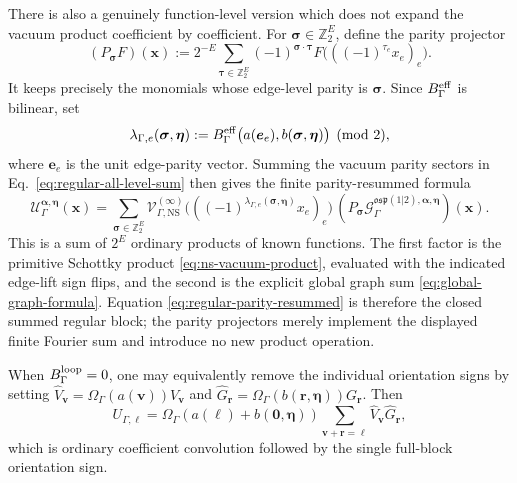 \documentclass[11pt]{article}
\newcommand{\NS}{\mathrm{NS}}
\newcommand{\osp}{\mathfrak{osp}(1|2)}
\newcommand{\G}{\mathcal G}
\newcommand{\V}{\mathcal V}
\newcommand{\U}{\mathcal U}
\begin{document}
There is also a genuinely function-level version which does not expand the
vacuum product coefficient by coefficient.  For
\(\bm\sigma\in\mathbb Z_2^E\), define the parity projector
\begin{equation}
 (P_{\bm\sigma}F)(\bm x)
 :=2^{-E}\sum_{\bm\tau\in\mathbb Z_2^E}
 (-1)^{\bm\sigma\cdot\bm\tau}
 F\bigl(((-1)^{\tau_e}x_e)_e\bigr).
 \label{eq:edge-parity-projector}
\end{equation}
It keeps precisely the monomials whose edge-level parity is
\(\bm\sigma\).  Since \(B_\Gamma^{\rm eff}\) is bilinear, set
\begin{equation}
 \lambda_{\Gamma,e}(\bm\sigma,\bm\eta)
 :=B_\Gamma^{\rm eff}\bigl(a(\bm e_e),b(\bm\sigma,\bm\eta)\bigr)
 \pmod2,
 \label{eq:regular-sign-flip-vector}
\end{equation}
where \(\bm e_e\) is the unit edge-parity vector.  Summing the vacuum
parity sectors in Eq.~\eqref{eq:regular-all-level-sum} then gives the finite
parity-resummed formula
\begin{equation}
\boxed{
 \U_\Gamma^{\bm\alpha,\bm\eta}(\bm x)
 =\sum_{\bm\sigma\in\mathbb Z_2^E}
 \V_{\Gamma,\NS}^{(\infty)}
 \bigl(((-1)^{\lambda_{\Gamma,e}(\bm\sigma,\bm\eta)}x_e)_e\bigr)
 \,(P_{\bm\sigma}
 \G_\Gamma^{\osp,\bm\alpha,\bm\eta})(\bm x).}
 \label{eq:regular-parity-resummed}
\end{equation}
This is a sum of \(2^E\) ordinary products of known functions.  The first
factor is the primitive Schottky product
\eqref{eq:ns-vacuum-product}, evaluated with the indicated edge-lift sign
flips, and the second is the explicit global graph sum
\eqref{eq:global-graph-formula}.  Equation
\eqref{eq:regular-parity-resummed} is therefore the closed summed regular
block; the parity projectors merely implement the displayed finite Fourier
sum and introduce no new product operation.

When \(B_\Gamma^{\rm loop}=0\), one may equivalently remove the individual
orientation signs by setting
\(\widehat V_{\bm v}=\Omega_\Gamma(a(\bm v))V_{\bm v}\) and
\(\widehat G_{\bm r}=\Omega_\Gamma(b(\bm r,\bm\eta))G_{\bm r}\).  Then
\begin{equation}
 U_{\Gamma,\bm\ell}
 =\Omega_\Gamma(a(\bm\ell)+b(\bm0,\bm\eta))
  \sum_{\bm v+\bm r=\bm\ell}
  \widehat V_{\bm v}\widehat G_{\bm r},
 \label{eq:orientation-free-convolution}
\end{equation}
which is ordinary coefficient convolution followed by the single full-block
orientation sign.
\end{document}
